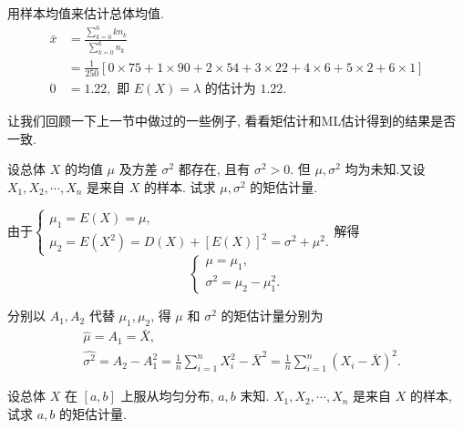 \begin{solution}
    用样本均值来估计总体均值. 
    $$
    \begin{aligned}
    \bar{x} & =\frac{\sum_{k=0}^6 k n_k}{\sum_{k=0}^6 n_k} \\
    & =\frac{1}{250}[0 \times 75+1 \times 90+2 \times 54+3 \times 22+4 \times 6+5 \times 2+6 \times 1]\\
    0&=1.22,\text { 即 } E(X)=\lambda \text { 的估计为 } 1.22 \text {. }
    \end{aligned}
    $$
\end{solution}

让我们回顾一下上一节中做过的一些例子, 看看矩估计和ML估计得到的结果是否一致. 

\begin{example}
    设总体 $X$ 的均值 $\mu$ 及方差 $\sigma^2$ 都存在, 且有 $\sigma^2>0$. 但 $\mu, \sigma^2$ 均为未知.又设 $X_1, X_2, \cdots, X_n$ 是来自 $X$ 的样本. 试求 $\mu, \sigma^2$ 的矩估计量.
\end{example}

\begin{solution}
    由于$\left\{\begin{array}{l}\mu_1=E(X)=\mu, \\ \mu_2=E\left(X^2\right)=D(X)+[E(X)]^2=\sigma^2+\mu^2 .\end{array}\right.$解得
$$
\left\{\begin{array}{l}
\mu=\mu_1, \\
\sigma^2=\mu_2-\mu_1^2 .
\end{array}\right.
$$

分别以 $A_1, A_2$ 代替 $\mu_1, \mu_2$, 得 $\mu$ 和 $\sigma^2$ 的矩估计量分别为
$$
\begin{aligned}
& \hat{\mu}=A_1=\bar{X}, \\
& \hat{\sigma^2}=A_2-A_1^2=\frac{1}{n} \sum_{i=1}^n X_i^2-\bar{X}^2=\frac{1}{n} \sum_{i=1}^n\left(X_i-\bar{X}\right)^2 .
\end{aligned}
$$
\end{solution}


\begin{example}
    设总体 $X$ 在 $[a, b]$ 上服从均匀分布, $a, b$ 末知. $X_1, X_2, \cdots, X_n$ 是来自 $X$ 的样本, 试求 $a, b$ 的矩估计量.
\end{example}

